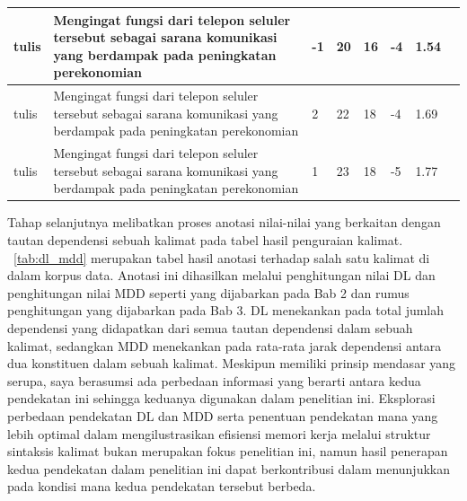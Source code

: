 \begin{center}
\begin{table}
\begin{tiny}
\begin{tabulary}{1\textwidth}{| L | L | L | L | L | L | L | L |}
tulis & Mengingat fungsi dari telepon seluler tersebut sebagai sarana komunikasi yang berdampak pada peningkatan perekonomian & -1 & 20 & 16 & -4 & 1.54 \\ \hline
tulis & Mengingat fungsi dari telepon seluler tersebut sebagai sarana komunikasi yang berdampak pada peningkatan perekonomian & 2 & 22 & 18 & -4 & 1.69 \\ \hline
tulis & Mengingat fungsi dari telepon seluler tersebut sebagai sarana komunikasi yang berdampak pada peningkatan perekonomian & 1 & 23 & 18 & -5 & 1.77 \\ \hline
  \end{tabulary}  
\end{tiny}
\end{table}
\end{center}

Tahap selanjutnya melibatkan proses anotasi nilai-nilai yang berkaitan dengan tautan dependensi sebuah kalimat pada tabel hasil penguraian kalimat. \tab~\ref{tab:dl_mdd} merupakan tabel hasil anotasi terhadap salah satu kalimat di dalam korpus data. Anotasi ini dihasilkan melalui penghitungan nilai DL dan penghitungan nilai MDD seperti yang dijabarkan pada Bab 2 dan rumus penghitungan yang dijabarkan pada Bab 3. DL menekankan pada total jumlah dependensi yang didapatkan dari semua tautan dependensi dalam sebuah kalimat, sedangkan MDD menekankan pada rata-rata jarak dependensi antara dua konstituen dalam sebuah kalimat. Meskipun memiliki prinsip mendasar yang serupa, saya berasumsi ada perbedaan informasi yang berarti antara kedua pendekatan ini sehingga keduanya digunakan dalam penelitian ini. Eksplorasi perbedaan pendekatan DL dan MDD serta penentuan pendekatan mana yang lebih optimal dalam mengilustrasikan efisiensi memori kerja melalui struktur sintaksis kalimat bukan merupakan fokus penelitian ini, namun hasil penerapan kedua pendekatan dalam penelitian ini dapat berkontribusi dalam menunjukkan pada kondisi mana kedua pendekatan tersebut berbeda.

